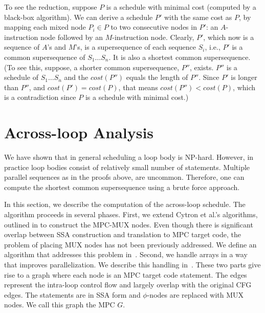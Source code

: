 To see the reduction, 
suppose $P$ is a schedule with minimal cost (computed by a black-box algorithm). 
We can derive a schedule $P'$ with the same cost as $P$, by mapping each mixed node $P_i \in P$ 
to two consecutive nodes in $P'$: an $A$-instruction node followed by an $M$-instruction node.
Clearly, $P'$, which now is a sequence of $A$'s and $M$'s, is a supersequence of each sequence 
$S_i$, i.e., $P'$ is a common supersequence 
of $S_1 \dots S_n$. It is also a shortest common supersequence. (To see this, suppose, a 
shorter common supersequence, $P''$, exists. $P''$ is a schedule of $S_1 \dots S_n$
and the $\mathit{cost}(P'')$ equals the length of $P''$. Since $P'$ is longer than
$P''$, and $\mathit{cost}(P') = \mathit{cost}(P)$, that means $\mathit{cost}(P'') < \mathit{cost}(P)$, 
which is a contradiction since $P$ is a schedule with minimal cost.)





\section{Across-loop Analysis}
\label{sec:analysis}

We have shown that in general scheduling a loop body is NP-hard. However, in practice loop bodies consist
of relatively small number of statements. Multiple parallel sequences as in the proofs above, are uncommon.
Therefore, one can compute the shortest common supersequence using a brute force approach. 

In this section, we describe the computation of the across-loop schedule. The algorithm proceeds in several phases. 
First, we extend Cytron et al.'s algorithms, outlined in 
to construct the MPC-MUX nodes. Even though there is significant overlap between SSA construction 
and translation to MPC target code, the problem of placing MUX nodes has not been previously addressed.
We define an algorithm that addresses this problem in~. Second, we handle arrays in a way that
improves parallelization. We describe this handling in~. These two parts give rise to a graph where  
each node is an MPC target code statement. The edges represent the intra-loop control flow and largely 
overlap with the original CFG edges. The statements are in SSA form and $\phi$-nodes are replaced with MUX nodes. 
We call this graph the MPC $G$. 

